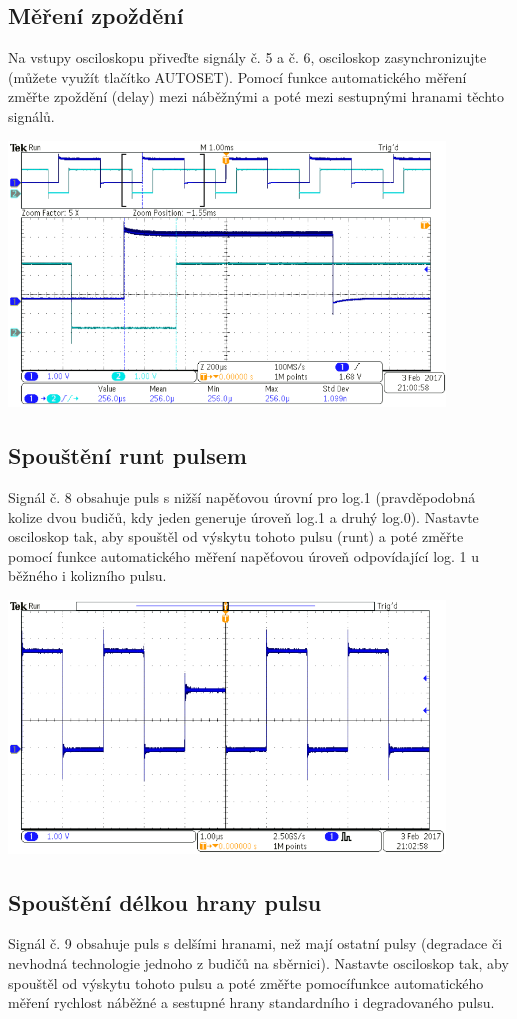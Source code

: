 \subsection{Měření zpoždění}
Na vstupy osciloskopu přiveďte signály č. 5 a č. 6, osciloskop zasynchronizujte (můžete využít tlačítko AUTOSET). Pomocí funkce automatického měření změřte zpoždění (delay) mezi náběžnými a poté mezi sestupnými hranami těchto signálů.

\includegraphics[width=0.87\textwidth]{images/06-zadani.png}

\subsection{Spouštění runt pulsem}
Signál č. 8 obsahuje puls s nižší napěťovou úrovní pro log.1 (pravděpodobná kolize dvou budičů, kdy jeden generuje úroveň log.1 a druhý log.0). Nastavte osciloskop tak, aby spouštěl od výskytu tohoto pulsu (runt) a poté změřte pomocí funkce automatického měření napěťovou úroveň odpovídající log. 1 u běžného i kolizního pulsu.

\includegraphics[width=0.87\textwidth]{images/07-zadani.png}

\subsection{Spouštění délkou hrany pulsu}
Signál č. 9 obsahuje puls s delšími hranami, než mají ostatní pulsy (degradace či nevhodná technologie jednoho z budičů na sběrnici). Nastavte osciloskop tak, aby spouštěl od výskytu tohoto pulsu a poté změřte pomocífunkce automatického měření rychlost náběžné a sestupné hrany standardního i degradovaného pulsu.

